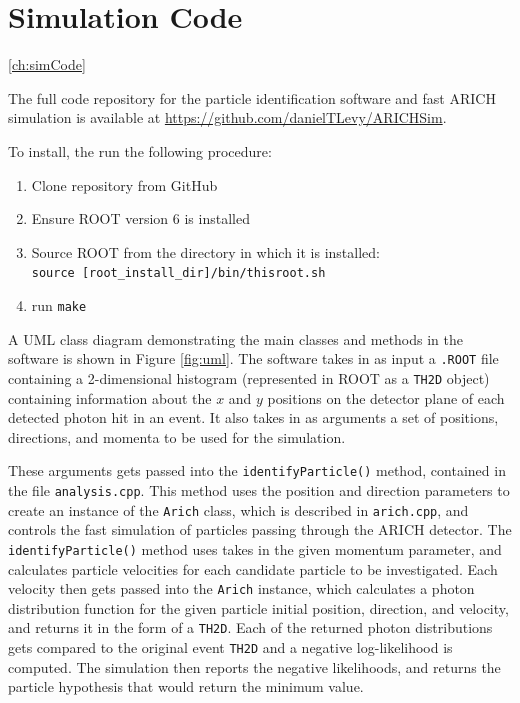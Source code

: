 
\chapter{Simulation Code}
\ref{ch:simCode}

The full code repository for the particle identification software and fast ARICH simulation is available at \url{https://github.com/danielTLevy/ARICHSim}.

To install, the run the following procedure:

\begin{enumerate}
\item Clone repository from GitHub
\item Ensure ROOT version 6 is installed
\item Source ROOT from the directory in which it is installed: \\ \verb!source [root_install_dir]/bin/thisroot.sh!
\item run \verb!make!
\end{enumerate}

A UML class diagram demonstrating the main classes and methods in the software is shown in Figure \ref{fig:uml}. 
The software takes in as input a \verb!.ROOT! file containing a 2-dimensional histogram (represented in ROOT as a \verb!TH2D! object) containing information about the $x$ and $y$ positions on the detector plane of each detected photon hit in an event.
It also takes in as arguments a set of positions, directions, and momenta to be used for the simulation.

These arguments gets passed into the \verb!identifyParticle()! method, contained in the file \verb!analysis.cpp!.
This method uses the position and direction parameters to create an instance of the \verb!Arich! class, which is described in \verb!arich.cpp!, and controls the fast simulation of particles passing through the ARICH detector.
The \verb!identifyParticle()! method uses takes in the given momentum parameter, and calculates particle velocities for each candidate particle to be investigated.
Each velocity then gets passed into the \verb!Arich! instance, which calculates a photon distribution function for the given particle initial position, direction, and velocity, and returns it in the form of a \verb!TH2D!.
Each of the returned photon distributions gets compared to the original event \verb!TH2D! and a negative log-likelihood is computed.
The simulation then reports the negative likelihoods, and returns the particle hypothesis that would return the minimum value.

